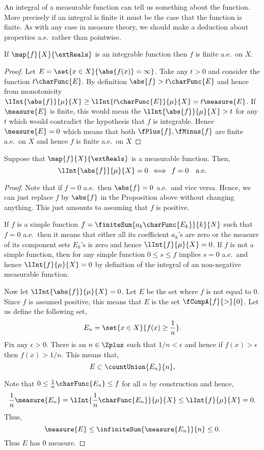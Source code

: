 An integral of a measurable function can tell us something about the function. More precisely if an integral
is finite it must be the case that the function is finite. As with any case in measure theory, we should make
a deduction about properties a.e.~rather than pointwise.
\begin{Proposition}\label{prop:integrable_func_finite_ae}
    If $\map{f}{X}{\extReals}$ is an integrable function then $f$ is finite a.e.~on $X$.
\end{Proposition}
\begin{proof}
    Let $E = \set{x\in X}{\abs{f(x)} = \infty}$. Take any $t > 0$ and consider the function $t\charFunc{E}$. By
    definition $\abs{f} > t\charFunc{E}$ and hence from monotonicity $\lInt{\abs{f}}{\mu}{X} \geq
    \lInt{t\charFunc{E}}{\mu}{X} = t\measure{E}$. If $\measure{E}$ is finite, this would mean the
    $\lInt{\abs{f}}{\mu}{X} > t$ for any $t$ which would contradict the hypothesis that $f$ is integrable.
    Hence $\measure{E} = 0$ which means that both $\fPlus{f},\fMinus{f}$ are finite a.e.~on $X$ and hence $f$
    is finite a.e.~on $X$
\end{proof}
\begin{Proposition}
    Suppose that $\map{f}{X}{\extReals}$ is a measurable function. Then,
    \[\lInt{\abs{f}}{\mu}{X} = 0 \,\iff\, f=0\quad\text{a.e.}\]
\end{Proposition}
\begin{proof}
    Note that if $f=0$ a.e.~then $\abs{f} = 0$ a.e.~and vice versa. Hence, we can just replace $f$ by
    $\abs{f}$ in the Proposition above without changing anything. This just amounts to assuming that $f$ is
    positive.

    If $f$ is a simple function $f = \finiteSum{a_k\charFunc{E_k}}{k}{N}$ such that $f = 0$ a.e.~then it 
    means that either all its coefficient $a_k$'s are
    zero or the measure of its component sets $E_k$'s is zero and hence $\lInt{f}{\mu}{X} = 0$. If $f$ is not
    a simple function, then for any simple function $0\leq s\leq f$ implies $s = 0$ a.e.~and hence
    $\lInt{f}{\mu}{X} = 0$ by definition of the integral of an non-negative measurable function. 

    Now let $\lInt{\abs{f}}{\mu}{X} = 0$. Let $E$ be the set where $f$ is not equal to $0$. Since $f$ is
    assumed positive, this means that $E$ is the set $\fCompA{f}{>}{0}$. Let us define the following set,
    \[E_n = \set{x\in X}{f(x) \geq \frac{1}{n}}.\]
    Fix any $\epsilon > 0$. There is an $n \in \Zplus$ such that $1/n < \epsilon$ and hence if $f(x) >
    \epsilon$ then $f(x) > 1/n$. This means that,
    \[E \subset \countUnion{E_n}{n},\]
   
    Note that $0\leq \frac{1}{n}\charFunc{E_n}\leq f$ for all $n$ by construction and hence,
    \[\frac{1}{n}\measure{E_n} = \lInt{\frac{1}{n}\charFunc{E_n}}{\mu}{X} \leq \lInt{f}{\mu}{X} = 0.\]
    Thus,
    \[\measure{E} \leq \infiniteSum{\measure{E_n}}{n} \leq 0.\]
    Thus $E$ has $0$ measure.
\end{proof}
